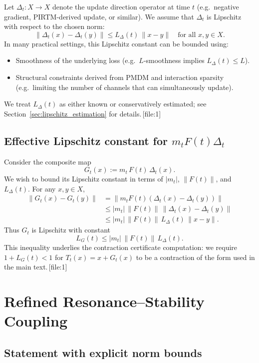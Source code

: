 \documentclass[11pt]{article}
\begin{document}
Let $\Delta_t : X \to X$ denote the update direction operator at time $t$ (e.g.\ negative gradient, PIRTM-derived update, or similar).
We assume that $\Delta_t$ is Lipschitz with respect to the chosen norm:
\[
  \|\Delta_t(x) - \Delta_t(y)\| \le L_\Delta(t)\,\|x-y\| \quad \text{for all } x,y\in X.
\]
In many practical settings, this Lipschitz constant can be bounded using:
\begin{itemize}
  \item Smoothness of the underlying loss (e.g.\ $L$-smoothness implies $L_\Delta(t)\le L$).
  \item Structural constraints derived from PMDM and interaction sparsity (e.g.\ limiting the number of channels that can simultaneously update).
\end{itemize}
We treat $L_\Delta(t)$ as either known or conservatively estimated; see Section~\ref{sec:lipschitz_estimation} for details.\,[file:1]

\subsection{Effective Lipschitz constant for $m_t F(t)\Delta_t$}

Consider the composite map
\[
  G_t(x) := m_t\,F(t)\,\Delta_t(x).
\]
We wish to bound its Lipschitz constant in terms of $|m_t|$, $\|F(t)\|$, and $L_\Delta(t)$.
For any $x,y\in X$,
\begin{align*}
  \|G_t(x) - G_t(y)\|
   &= \|m_t F(t)(\Delta_t(x) - \Delta_t(y))\| \\
   &\le |m_t| \,\|F(t)\|\,\|\Delta_t(x) - \Delta_t(y)\| \\
   &\le |m_t|\,\|F(t)\|\,L_\Delta(t)\,\|x-y\|.
\end{align*}
Thus $G_t$ is Lipschitz with constant
\[
  L_G(t) \le |m_t|\,\|F(t)\|\,L_\Delta(t).
\]
This inequality underlies the contraction certificate computation: we require $1 + L_G(t) < 1$ for $T_t(x) = x + G_t(x)$ to be a contraction of the form used in the main text.\,[file:1]

\section{Refined Resonance--Stability Coupling}

\subsection{Statement with explicit norm bounds}
\end{document}
